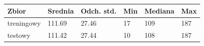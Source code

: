 \begin{tabular}{llllll}
\toprule
Zbior & Srednia & Odch. std. & Min & Mediana & Max \\
\midrule
treningowy & 111.69 & 27.46 & 17 & 109 & 187 \\
testowy & 111.42 & 27.44 & 10 & 108 & 187 \\
\bottomrule
\end{tabular}
